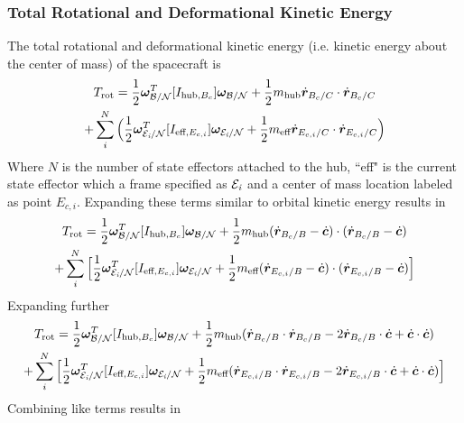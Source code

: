 \subsubsection{Total Rotational and Deformational Kinetic Energy}

The total rotational and deformational kinetic energy (i.e. kinetic energy about the center of mass) of the spacecraft is
\begin{multline}
T_{\text{rot}} = \frac{1}{2} \bm \omega_{\cal{B/N}}^T [I_{\text{hub},B_c}] \bm \omega_{\cal{B/N}} + \frac{1}{2} m_{\text{hub}} \dot{\bm r}_{B_c/C} \cdot \dot{\bm r}_{B_c/C} \\
+ \sum\limits_{i}^{N}\Big(\frac{1}{2} \bm \omega_{\cal{E}_{\textit{i}}/\cal{N}}^T [I_{\text{eff},E_{c,i}}] \bm \omega_{\cal{E}_{\textit{i}}/\cal{N}}
+ \frac{1}{2} m_{\text{eff}} \dot{\bm r}_{E_{c,i}/C} \cdot \dot{\bm r}_{E_{c,i}/C}\Big)
\end{multline}
Where $N$ is the number of state effectors attached to the hub, ``eff" is the current state effector which a frame specified as $\cal{E}_{\textit{i}}$ and a center of mass location labeled as point $E_{c,i}$. Expanding these terms similar to orbital kinetic energy results in 
\begin{multline}
T_{\text{rot}} = \frac{1}{2} \bm \omega_{\cal{B/N}}^T [I_{\text{hub},B_c}] \bm \omega_{\cal{B/N}} + \frac{1}{2} m_{\text{hub}} (\dot{\bm r}_{B_c/B} - \dot{\bm c}) \cdot (\dot{\bm r}_{B_c/B} - \dot{\bm c}) \\
+ \sum\limits_{i}^{N}\Big[\frac{1}{2} \bm \omega_{\cal{E}_{\textit{i}}/\cal{N}}^T [I_{\text{eff},E_{c,i}}] \bm \omega_{\cal{E}_{\textit{i}}/\cal{N}}
+ \frac{1}{2} m_{\text{eff}} (\dot{\bm r}_{E_{c,i}/B} - \dot{\bm c}) \cdot (\dot{\bm r}_{E_{c,i}/B} - \dot{\bm c})\Big]
\end{multline}
Expanding further
\begin{multline}
T_{\text{rot}} = \frac{1}{2} \bm \omega_{\cal{B/N}}^T [I_{\text{hub},B_c}] \bm \omega_{\cal{B/N}} + \frac{1}{2} m_{\text{hub}} (\dot{\bm r}_{B_c/B}\cdot\dot{\bm r}_{B_c/B} - 2 \dot{\bm r}_{B_c/B} \cdot \dot{\bm c}  + \dot{\bm c} \cdot \dot{\bm c}) \\
+ \sum\limits_{i}^{N}\Big[\frac{1}{2} \bm \omega_{\cal{E}_{\textit{i}}/\cal{N}}^T [I_{\text{eff},E_{c,i}}] \bm \omega_{\cal{E}_{\textit{i}}/\cal{N}}
+ \frac{1}{2} m_{\text{eff}} (\dot{\bm r}_{E_{c,i}/B} \cdot \dot{\bm r}_{E_{c,i}/B} - 2 \dot{\bm r}_{E_{c,i}/B} \cdot \dot{\bm c} + \dot{\bm c} \cdot \dot{\bm c})\Big]
\end{multline}
Combining like terms results in
